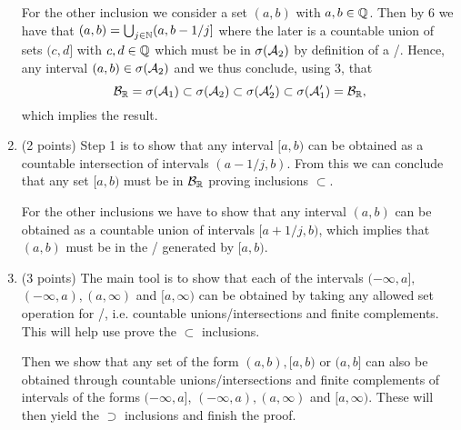 \begin{enumerate}
For the other inclusion we consider a set $(a,b)$ with $a,b \in \mathbb Q$. Then by 6 we have that $(a,b) = \bigcup_{j \in \mathbb N} (a,b-1/j]$ where the later is a countable union of sets $(c,d]$ with $c,d \in \mathbb Q$ which must be in $\sigma(\mathcal A_2)$ by definition of a \sigalg/. Hence, any interval $(a,b) \in \sigma(\mathcal A_2)$ and we thus conclude, using 3, that
\[
	\mathcal B_{\mathbb R} = \sigma(\mathcal A_1) \subset \sigma(\mathcal A_2) \subset \sigma(\mathcal A_2^\prime) \subset \sigma(\mathcal A_1^\prime) = \mathcal B_{\mathbb R},
\]
which implies the result.
\item (2 points) Step 1 is to show that any interval $[a,b)$ can be obtained as a countable intersection of intervals $(a-1/j,b)$. From this we can conclude that any set $[a,b)$ must be in $\mathcal B_{\mathbb R}$ proving inclusions $\subset$.

For the other inclusions we have to show that any interval $(a,b)$ can be obtained as a countable union of intervals $[a+1/j, b)$, which implies that $(a,b)$ must be in the \sigalg/ generated by $[a,b)$. 
\item (3 points) The main tool is to show that each of the intervals $(-\infty, a],$ $(-\infty ,a), (a,\infty)$ and $[a,\infty)$ can be obtained by taking any allowed set operation for \sigalgs/, i.e. countable unions/intersections and finite complements. This will help use prove the $\subset$ inclusions. 

Then we show that any set of the form $(a,b), [a,b)$ or $(a,b]$ can also be obtained through countable unions/intersections and finite complements of intervals of the forms $(-\infty, a]$, $(-\infty ,a), (a,\infty)$ and $[a,\infty)$. These will then yield the $\supset$ inclusions and finish the proof.
\end{enumerate}